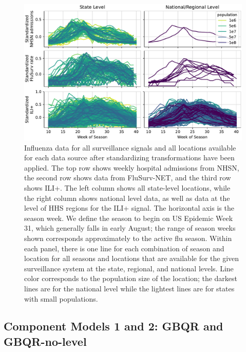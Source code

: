 \documentclass{article}\usepackage[]{graphicx}\usepackage[]{xcolor}
\begin{document}
\begin{figure}[!ht]
    \centering
    \includegraphics[width=\textwidth]{../artifacts/figures/data_standardized.pdf}
    \caption{Influenza data for all surveillance signals and all locations available for each data source after standardizing transformations have been applied. The top row shows weekly hospital admissions from NHSN, the second row shows data from FluSurv-NET, and the third row shows ILI+. The left column shows all state-level locations, while the right column shows national level data, as well as data at the level of HHS regions for the ILI+ signal. The horizontal axis is the season week. We define the season to begin on US Epidemic Week 31, which generally falls in early August; the range of season weeks shown corresponds approximately to the active flu season. Within each panel, there is one line for each combination of season and location for all seasons and locations that are available for the given surveillance system at the state, regional, and national levels.  Line color corresponds to the population size of the location; the darkest lines are for the national level while the lightest lines are for states with small populations.}
    \label{fig:data_standardized}
\end{figure}

\subsection{Component Models 1 and 2: GBQR and GBQR-no-level}
\label{subsec:model_gbqr}
\end{document}

